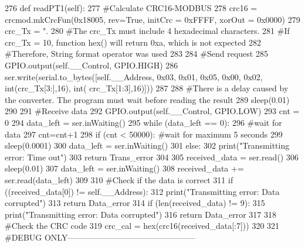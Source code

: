 \begin{DoxyCode}
276     \textcolor{keyword}{def }readPT1(self):
277         \textcolor{comment}{#Calculate CRC16-MODBUS
}
278         crc16 = crcmod.mkCrcFun(0x18005, rev=\textcolor{keyword}{True}, initCrc = 0xFFFF, xorOut = 0x0000)
279         crc\_Tx = \textcolor{stringliteral}{".%
280         \textcolor{comment}{#The crc\_Tx must include 4 hexadecimal characters.
}
281         \textcolor{comment}{#If crc\_Tx =  10, function hex() will return 0xa, which is not expected
}
282         \textcolor{comment}{#Therefore, String format operator was used
}
283     
284         \textcolor{comment}{#Send request
}
285         GPIO.output(self.\_\_Control, GPIO.HIGH)
286         ser.write(serial.to\_bytes([self.\_\_Address, 0x03, 0x01, 0x05, 0x00, 0x02, int(crc\_Tx[3:],16), int(
      crc\_Tx[1:3],16)]))
287     
288         \textcolor{comment}{#There is a delay caused by the converter. The program must wait before reading the result
}
289         sleep(0.01)
290     
291         \textcolor{comment}{#Receive data
}
292         GPIO.output(self.\_\_Control, GPIO.LOW)
293         cnt = 0
294         data\_left = ser.inWaiting()
295         \textcolor{keywordflow}{while} (data\_left == 0):
296             \textcolor{comment}{#wait for data
}
297             cnt=cnt+1
298             \textcolor{keywordflow}{if} (cnt < 50000): \textcolor{comment}{#wait for maximum 5 seconds
}
299                 sleep(0.0001)
300                 data\_left = ser.inWaiting()
301             \textcolor{keywordflow}{else}:
302                 print(\textcolor{stringliteral}{"Transmitting error: Time out"})
303                 \textcolor{keywordflow}{return} Trans\_error
304     
305         received\_data = ser.read()
306         sleep(0.01)
307         data\_left = ser.inWaiting()
308         received\_data += ser.read(data\_left)
309         
310         \textcolor{comment}{#Check if the data is correct
}
311         \textcolor{keywordflow}{if} ((received\_data[0]) != self.\_\_Address):
312             print(\textcolor{stringliteral}{"Transmitting error: Data corrupted"})
313             \textcolor{keywordflow}{return} Data\_error
314         \textcolor{keywordflow}{if} (len(received\_data) != 9):
315             print(\textcolor{stringliteral}{"Transmitting error: Data corrupted"})
316             \textcolor{keywordflow}{return} Data\_error
317         
318         \textcolor{comment}{#Check the CRC code
}
319         crc\_cal = hex(crc16(received\_data[:7]))
320 
321         \textcolor{comment}{#DEBUG ONLY-----------------------------------------------
}}
\end{DoxyCode}
